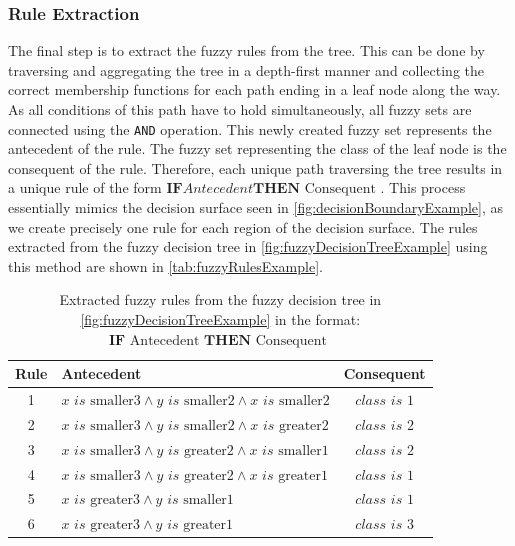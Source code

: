 \subsubsection{Rule Extraction}

The final step is to extract the fuzzy rules from the tree. This can be done by traversing and aggregating the tree in a depth-first manner and collecting the correct membership functions for each path ending in a leaf node along the way. As all conditions of this path have to hold simultaneously, all fuzzy sets are connected using the \texttt{AND} operation. This newly created fuzzy set represents the antecedent of the rule. The fuzzy set representing the class of the leaf node is the consequent of the rule. Therefore, each unique path traversing the tree results in a unique rule of the form $\textbf{IF} { Antecedent } \textbf{THEN} \text{ Consequent }$. This process essentially mimics the decision surface seen in \autoref{fig:decisionBoundaryExample}, as we create precisely one rule for each region of the decision surface. The rules extracted from the fuzzy decision tree in \autoref{fig:fuzzyDecisionTreeExample} using this method are shown in \autoref{tab:fuzzyRulesExample}.


\newcommand{\is}{\textit{ is }}


\begin{table}[H]
    \centering
    \begin{tabular}{c|l|c}
        \textbf{Rule} & \textbf{Antecedent}                                                             & \textbf{Consequent} \\
        \hline
        1             & $x \is \text{smaller3} \land y \is \text{smaller2} \land x \is \text{smaller2}$ & $class \is 1$       \\
        2             & $x \is \text{smaller3} \land y \is \text{smaller2} \land x \is \text{greater2}$ & $class \is 2$       \\
        3             & $x \is \text{smaller3} \land y \is \text{greater2} \land x \is \text{smaller1}$ & $class \is 2$       \\
        4             & $x \is \text{smaller3} \land y \is \text{greater2} \land x \is \text{greater1}$ & $class \is 1$       \\
        5             & $x \is \text{greater3} \land y \is \text{smaller1}$                             & $class \is 1$       \\
        6             & $x \is \text{greater3} \land y \is \text{greater1}$                             & $class \is 3$       \\
    \end{tabular}
    \caption[Extracted fuzzy rules from the example fuzzy decision tree]{Extracted fuzzy rules from the fuzzy decision tree in \autoref{fig:fuzzyDecisionTreeExample} in the format: $\textbf{IF} \text{ Antecedent } \textbf{THEN} \text{ Consequent }$}
    \label{tab:fuzzyRulesExample}
\end{table}

